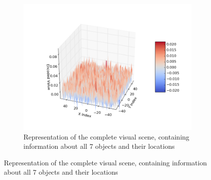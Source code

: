 \documentclass[conference]{IEEEtran}
\begin{document}
\begin{figure}[th!]
				\begin{subfigure}{0.8\columnwidth}
					\center
					\includegraphics[width=\linewidth]{img/coord_example_3.png}
					\caption{Representation of the complete visual scene, containing information about all 7 objects and their locations}
					\label{fig:encoding-scene}
				\end{subfigure}
			

\end{figure}
\end{document}
